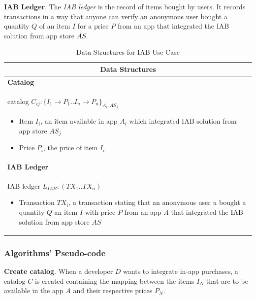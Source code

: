\noindent \textbf{IAB Ledger}. The \textit{IAB ledger} is the record of items bought by users. It records transactions in a way that anyone can verify an anonymous user bought a quantity $Q$ of an item $I$ for a price $P$ from an app that integrated the IAB solution from app store $AS$.
\begin{table}[H]
\footnotesize
\centering
\begin{tabular}{|p{}|}
\hline
\multicolumn{1}{|c|}{Data Structures} \\
\hline \vspace{0.05cm}
\textbf{Catalog} \\
catalog $C_{ij} : \{I_1 \to P_1..I_n \to P_n\}_{A_i, AS_j}$
\begin{itemize}
	\item Item $I_i$, an item available in app $A_i$ which integrated IAB solution from app store $AS_j$
	\item Price $P_i$, the price of item $I_i$
\end{itemize} \\
\textbf{IAB Ledger} \\
IAB ledger $L_{IAB} : (TX_1..TX_n)$
\begin{itemize}
	\item Transaction $TX_i$, a transaction stating that an anonymous user $u$ bought a quantity $Q$ an item $I$ with price $P$ from an app $A$ that integrated the IAB solution from app store $AS$
\end{itemize} \\
\hline
\end{tabular}
\caption{Data Structures for IAB Use Case}
\label{table: data_structures_iab}
\end{table}


\subsubsection{Algorithms' Pseudo-code}

\noindent \textbf{Create catalog}. When a developer $D$ wants to integrate in-app purchases, a catalog $C$ is created containing the mapping between the items $I_N$ that are to be available in the app $A$ and their respective prices $P_N$. \\

